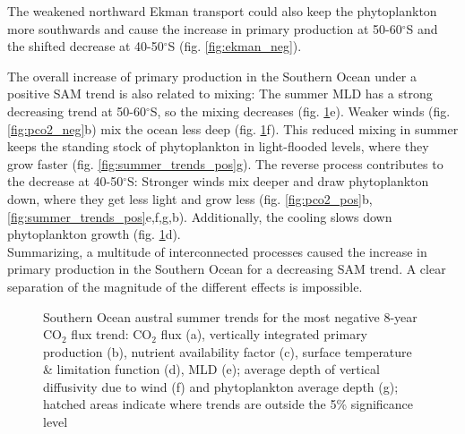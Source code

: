 The weakened northward Ekman transport could also keep the phytoplankton more southwards and cause the increase in primary production at 50-60$^\circ$S and the shifted decrease at 40-50$^\circ$S (fig. \ref{fig:ekman_neg}).

The overall increase of primary production in the Southern Ocean under a positive \acs{SAM} trend is also related to mixing:
The summer \acs{MLD} has a strong decreasing trend at 50-60$^\circ$S, so the mixing decreases (fig. \ref{fig:summer_trends_neg}e). Weaker winds (fig. \ref{fig:pco2_neg}b) mix the ocean less deep (fig. \ref{fig:summer_trends_neg}f). This reduced mixing in summer keeps the standing stock of phytoplankton in light-flooded levels, where they grow faster (fig. \ref{fig:summer_trends_pos}g). 
The reverse process contributes to the decrease at 40-50$^\circ$S: Stronger winds mix deeper and draw phytoplankton down, where they get less light and grow less (fig. \ref{fig:pco2_pos}b, \ref{fig:summer_trends_pos}e,f,g,b). Additionally, the cooling slows down phytoplankton growth (fig. \ref{fig:summer_trends_neg}d).
\\

Summarizing, a multitude of interconnected processes caused the increase in primary production in the Southern Ocean for a decreasing SAM trend. A clear separation of the magnitude of the different effects is impossible.
 

\begin{figure}[h!]

		\caption{Southern Ocean austral summer trends for the most negative 8-year CO$_2$ flux trend: CO$_2$ flux (a), vertically integrated primary production (b), nutrient availability factor (c), surface temperature \& limitation function (d), \ac{MLD} (e); average depth of vertical diffusivity due to wind (f) and phytoplankton average depth (g); hatched areas indicate where trends are outside the 5\% significance level}
	\label{fig:summer_trends_neg}
\end{figure}
